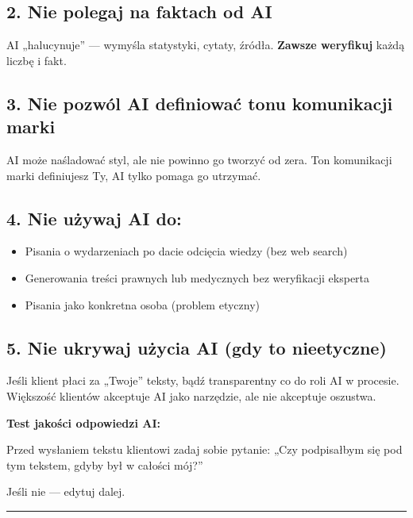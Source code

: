 \documentclass[
  12pt,
  a4paper,
  twoside,
  openright,
  12pt,
  DIV=12,
  BCOR=12mm]{scrbook}
\providecommand{\tightlist}{%
  \setlength{\itemsep}{0pt}\setlength{\parskip}{0pt}}\usepackage{longtable,booktabs,array}
\newcommand{\decoline}{%
  \begin{center}
    \textcolor{bordergray}{\rule{0.3\textwidth}{0.5pt}}
  \end{center}
}
\begin{document}
\subsection{2. Nie polegaj na faktach od
AI}\label{nie-polegaj-na-faktach-od-ai}

AI „halucynuje'' --- wymyśla statystyki, cytaty, źródła. \textbf{Zawsze
weryfikuj} każdą liczbę i fakt.

\subsection{3. Nie pozwól AI definiować tonu komunikacji
marki}\label{nie-pozwuxf3l-ai-definiowaux107-tonu-komunikacji-marki}

AI może naśladować styl, ale nie powinno go tworzyć od zera. Ton
komunikacji marki definiujesz Ty, AI tylko pomaga go utrzymać.

\subsection{4. Nie używaj AI do:}\label{nie-uux17cywaj-ai-do}

\begin{itemize}
\tightlist
\item
  Pisania o wydarzeniach po dacie odcięcia wiedzy (bez web search)
\item
  Generowania treści prawnych lub medycznych bez weryfikacji eksperta
\item
  Pisania jako konkretna osoba (problem etyczny)
\end{itemize}

\subsection{5. Nie ukrywaj użycia AI (gdy to
nieetyczne)}\label{nie-ukrywaj-uux17cycia-ai-gdy-to-nieetyczne}

Jeśli klient płaci za „Twoje'' teksty, bądź transparentny co do roli AI
w procesie. Większość klientów akceptuje AI jako narzędzie, ale nie
akceptuje oszustwa.

\begin{wazne}
\textbf{Test jakości odpowiedzi AI:}

Przed wysłaniem tekstu klientowi zadaj sobie pytanie: „Czy podpisałbym się pod tym tekstem, gdyby był w całości mój?”

Jeśli nie --- edytuj dalej.
\end{wazne}

\decoline
\end{document}
